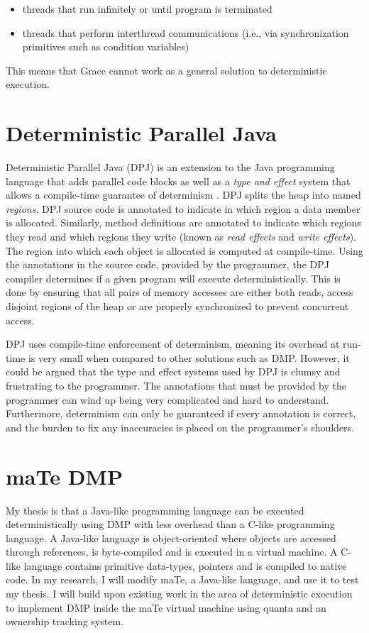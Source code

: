 \begin{itemize}
\item threads that run infinitely or until program is terminated

\item threads that perform interthread communications (i.e., via
  synchronization primitives such as condition variables)
\end{itemize}

This means that Grace cannot work as a general solution to
deterministic execution.

\section{Deterministic Parallel Java}

Deterministic Parallel Java (DPJ) is an extension to the Java
programming language that adds parallel code blocks as well as a
\emph{type and effect} system that allows a compile-time guarantee of
determinism \cite{dpj}.  DPJ splits the heap into named
\emph{regions}.  DPJ source code is annotated to indicate in which
region a data member is allocated.  Similarly, method definitions are
annotated to indicate which regions they read and which regions they
write (known as \emph{read effects} and \emph{write effects}).  The
region into which each object is allocated is computed at
compile-time.  Using the annotations in the source code, provided by
the programmer, the DPJ compiler determines if a given program will
execute deterministically.  This is done by ensuring that all pairs of
memory accesses are either both reads, access disjoint regions of the
heap or are properly synchronized to prevent concurrent access.

DPJ uses compile-time enforcement of determinism, meaning its overhead
at run-time is very small when compared to other solutions such as
DMP.  However, it could be argued that the type and effect systems
used by DPJ is clumsy and frustrating to the programmer.  The
annotations that must be provided by the programmer can wind up being
very complicated and hard to understand.  Furthermore, determinism can
only be guaranteed if every annotation is correct, and the burden to
fix any inaccuracies is placed on the programmer's shoulders.

\section{maTe DMP}

My thesis is that a Java-like programming language can be executed
deterministically using DMP with less overhead than a C-like
programming language.  A Java-like language is object-oriented where
objects are accessed through references, is byte-compiled and is
executed in a virtual machine.  A C-like language contains primitive
data-types, pointers and is compiled to native code.  In my research,
I will modify maTe, a Java-like language, and use it to test my
thesis.  I will build upon existing work in the area of deterministic
execution to implement DMP inside the maTe virtual machine using
quanta and an ownership tracking system.

